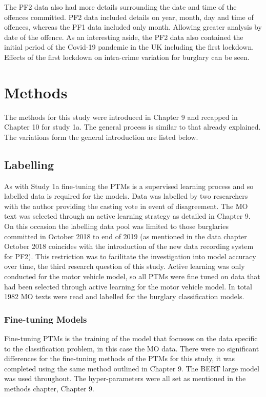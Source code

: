 The PF2 data also had more details surrounding the date and time of the offences committed. PF2 data included details on year, month, day and time of  offences, whereas the PF1 data included only month. Allowing greater analysis by date of the offence. As an interesting aside, the PF2 data also contained the initial period of the Covid-19 pandemic in the UK including the first lockdown. Effects of the first lockdown on intra-crime variation for burglary can be seen.   


\section{Methods} The methods for this study were introduced in Chapter 9 and recapped in Chapter 10 for study 1a. The general process is similar to that already explained. The variations form the general introduction are listed below.

\subsection{Labelling} As with Study 1a fine-tuning the PTMs is a supervised learning process and so labelled data is required for the models. Data was labelled by two researchers with the author providing the casting vote in event of disagreement. The MO text was selected through an active learning strategy as detailed in Chapter 9. On this occasion the labelling data pool was limited to those burglaries committed in October 2018 to end of 2019 (as mentioned in the data chapter October 2018 coincides with the introduction of the new data recording system for PF2). This restriction was to facilitate the investigation into model accuracy over time, the third research question of this study.  Active learning was only conducted for the motor vehicle model, so all PTMs were fine tuned on data that had been selected through active learning for the motor vehicle model. In total 1982 MO texts were read and labelled for the burglary classification models.

\subsubsection{Fine-tuning Models} Fine-tuning PTMs is the training of the model that focusses on the data specific to the classification problem, in this case the MO data. There were no significant differences for the fine-tuning methods of the PTMs for this study, it was completed using the same method outlined in Chapter 9. The BERT large model was used throughout. The hyper-parameters were all set as mentioned in the methods chapter, Chapter 9. 

